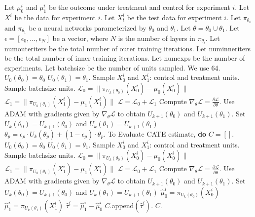 \newpage

\begin{algorithm}[H]
	\caption{SF Reptile T-learner}
	\label{alg:sf-reptile-t}
	\begin{algorithmic}[1]
		\State Let $\mu_0^i$ and $\mu_1^i$ be the outcome under treatment and control for experiment $i$. 
		\State Let $X^i$ be the data for experiment $i$. Let $X^i_t$ be the test data for experiment $i$. 
		\State Let $\pi_{\theta_0}$ and $\pi_{\theta_1}$ be a neural networks parameterized by $\theta_0$ and $\theta_1$. 
		\State Let $\theta = \theta_0 \cup \theta_1$. 
		\State Let $\epsilon = \left[\epsilon_0, \dots, \epsilon_{N} \right]$ be a vector, where $N$ is the number of layers in $\pi_{\theta_i}$. 
		\State Let numouteriters be the total number of outer training iterations.
		\State Let numinneriters be the total number of inner training iterations. 
		\State Let numexps be the number of experiments. 
		\State Let batchsize be the number of units sampled. We use 64. 
		\State $U_0(\theta_0) = \theta_0$ 
		\State $U_0(\theta_1) = \theta_1$. 
		\State Sample $X_0^i$ and $X_1^i$: control and treatment units. Sample batchsize units.  
		\State $\mathcal{L}_0= \| \pi_{U_k(\theta_0)} (X_0^i) - \mu_0(X_0^i) \| $
		\State $\mathcal{L}_1 = \| \pi_{U_k(\theta_1)} (X_1^i) - \mu_1(X_1^i) \| $
		\State $\mathcal{L} = \mathcal{L}_0 + \mathcal{L}_1$
		\State Compute $\nabla_{\theta} \mathcal{L} = \frac{\partial \mathcal{L}}{\partial \theta}$.
		\State Use ADAM with gradients given by $\nabla_{\theta} \mathcal{L}$ to obtain $U_{k+1}(\theta_0)$ and $U_{k+1}(\theta_1)$. 
		\State Set $U_{k}(\theta_0)=U_{k+1}(\theta_0)$ and $U_{k}(\theta_1) = U_{k+1}(\theta_1)$
		\EndFor
		\State $\theta_p = \epsilon_p \cdot U_k(\theta_p) + (1 - \epsilon_p) \cdot \theta_p$.  
		\EndFor
		\EndFor
		\EndFor
		\State To Evaluate CATE estimate, \textbf{do}
		\State $C = []$. 
		\State $U_0(\theta_0) = \theta_0$ 
		\State $U_0(\theta_1) = \theta_1$. 
		\State Sample $X_0^i$ and $X_1^i$: control and treatment units. Sample batchsize units.  
		\State $\mathcal{L}_0= \| \pi_{U_k(\theta_0)} (X_0^i) - \mu_0(X_0^i) \| $
		\State $\mathcal{L}_1 = \| \pi_{U_k(\theta_1)} (X_1^i) - \mu_1(X_1^i) \| $
		\State $\mathcal{L} = \mathcal{L}_0 + \mathcal{L}_1$
		\State Compute $\nabla_{\theta} \mathcal{L} = \frac{\partial \mathcal{L}}{\partial \theta}$.
		\State Use ADAM with gradients given by $\nabla_{\theta} \mathcal{L}$ to obtain $U_{k+1}(\theta_0)$ and $U_{k+1}(\theta_1)$. 
		\State Set $U_{k}(\theta_0)=U_{k+1}(\theta_0)$ and $U_{k}(\theta_1) = U_{k+1}(\theta_1)$
		\EndFor
		\State $\hat{\mu}_0^i = \pi_{U_k(\theta_0)}(X_0^i)$
		\State $\hat{\mu}_1^i = \pi_{U_k(\theta_1)}(X_1^i)$
		\State $\hat{\tau}^i =  \hat{\mu}_1^i - \hat{\mu}_0^i$
		\State $C.$append$(\hat{\tau}^i)$. 
		\EndFor
		 $C$. 
	\end{algorithmic}
\end{algorithm}

